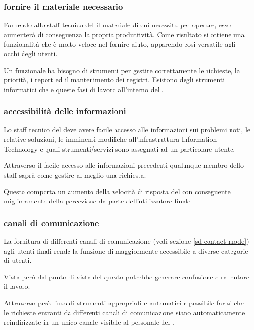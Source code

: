 \subsubsection[Fornire il materiale necessario]{fornire il materiale necessario}
Fornendo allo staff tecnico del  il materiale di cui necessita per operare, esso aumenterà di conseguenza la propria produttività. Come risultato si ottiene una funzionalità che è molto veloce nel fornire aiuto, apparendo cosi versatile agli occhi degli utenti.

Un  funzionale ha bisogno di strumenti per gestire correttamente le richieste, la priorità, i report ed il mantenimento dei registri. Esistono degli strumenti informatici che  e  queste fasi di lavoro all'interno del .

\subsubsection[Accessibilità delle informazioni]{accessibilità delle informazioni}
Lo staff tecnico del  deve avere facile accesso alle informazioni sui problemi noti, le relative soluzioni, le imminenti modifiche all'infrastruttura \acs{Information-Technology} e quali strumenti/servizi sono assegnati ad un particolare utente.

Attraverso il facile accesso alle informazioni precedenti qualunque membro dello staff saprà come gestire al meglio una richiesta.

Questo comporta un aumento della velocità di risposta del  con conseguente miglioramento della percezione da parte dell'utilizzatore finale.

\subsubsection[Canali di comunicazione]{canali di comunicazione}
La fornitura di differenti canali di comunicazione (vedi sezione \ref{sd-contact-mode}) agli utenti finali rende la funzione di  maggiormente accessibile a diverse categorie di utenti.

Vista però dal punto di vista del  questo potrebbe generare confusione e rallentare il lavoro.

Attraverso però l'uso di strumenti appropriati e automatici è possibile far si che le richieste entranti da differenti canali di comunicazione siano automaticamente reindirizzate in un unico canale visibile al personale del .

